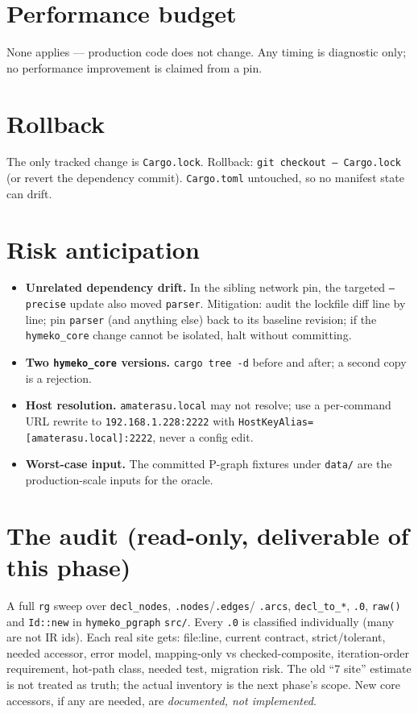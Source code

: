\documentclass[11pt]{article}
\begin{document}
\section{Performance budget}

None applies --- production code does not change. Any timing is diagnostic only;
no performance improvement is claimed from a pin.

\section{Rollback}

The only tracked change is \texttt{Cargo.lock}. Rollback: \texttt{git checkout --
Cargo.lock} (or revert the dependency commit). \texttt{Cargo.toml} untouched, so
no manifest state can drift.

\section{Risk anticipation}

\begin{itemize}
\item \textbf{Unrelated dependency drift.} In the sibling network pin, the targeted
\texttt{--precise} update also moved \texttt{parser}. Mitigation: audit the
lockfile diff line by line; pin \texttt{parser} (and anything else) back to its
baseline revision; if the \texttt{hymeko\_core} change cannot be isolated, halt
without committing.
\item \textbf{Two \texttt{hymeko\_core} versions.} \texttt{cargo tree -d} before and
after; a second copy is a rejection.
\item \textbf{Host resolution.} \texttt{amaterasu.local} may not resolve; use a
per-command URL rewrite to \texttt{192.168.1.228:2222} with
\texttt{HostKeyAlias=[amaterasu.local]:2222}, never a config edit.
\item \textbf{Worst-case input.} The committed P-graph fixtures under \texttt{data/}
are the production-scale inputs for the oracle.
\end{itemize}

\section{The audit (read-only, deliverable of this phase)}

A full \texttt{rg} sweep over \texttt{decl\_nodes}, \texttt{.nodes}/\texttt{.edges}/%
\texttt{.arcs}, \texttt{decl\_to\_*}, \texttt{.0}, \texttt{raw()} and
\texttt{Id::new} in \texttt{hymeko\_pgraph} \texttt{src/}. Every \texttt{.0} is
classified individually (many are not IR ids). Each real site gets: file:line,
current contract, strict/tolerant, needed accessor, error model, mapping-only vs
checked-composite, iteration-order requirement, hot-path class, needed test,
migration risk. The old ``7 site'' estimate is not treated as truth; the actual
inventory is the next phase's scope. New core accessors, if any are needed, are
\emph{documented, not implemented}.
\end{document}
